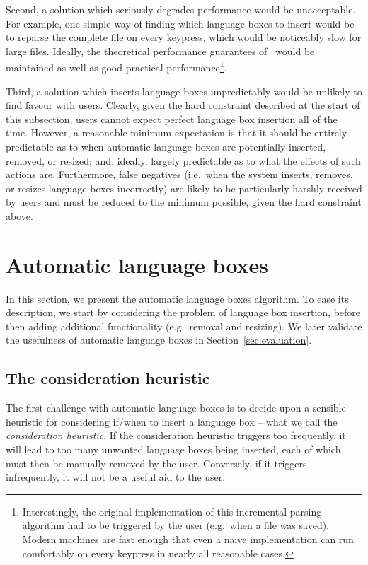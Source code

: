 \documentclass[sigplan,screen]{acmart}\settopmatter{printfolios=true,printccs=false,printacmref=false}
\begin{document}
Second, a solution which seriously degrades performance would be unacceptable.
For example, one simple way of finding which language boxes to insert would
be to reparse the complete file on every keypress, which would be noticeably slow for large
files. Ideally, the theoretical performance guarantees
of~\citet{wagner98practicalalgorithms} would be maintained as well as good
practical performance\footnote{Interestingly, the original implementation of
this incremental parsing algorithm had to be triggered by the user (e.g.~when
a file was saved). Modern machines are fast enough that even a naive
implementation can run comfortably on every keypress in nearly all reasonable
cases.}.

Third, a solution which inserts language boxes unpredictably would be unlikely
to find favour with users. Clearly, given the hard constraint described at the
start of this subsection, users cannot expect perfect language box insertion
all of the time. However, a reasonable minimum expectation is that it should be
entirely predictable as to when automatic language boxes are potentially
inserted, removed, or
resized; and, ideally, largely predictable as to what the effects of such
actions are. Furthermore, false negatives (i.e.~when the system inserts, removes,
or resizes language boxes incorrectly) are likely to be particularly harshly
received by users and must be reduced to the minimum possible, given the hard
constraint above.


\section{Automatic language boxes}

In this section, we present the automatic language boxes algorithm. To ease its
description, we start by considering the problem of language box
insertion, before then adding additional functionality (e.g.~removal and
resizing). We later validate the usefulness of automatic language boxes in
Section~\ref{sec:evaluation}.


\subsection{The consideration heuristic}

The first challenge with automatic language boxes is to decide upon a sensible
heuristic for considering if/when to insert a language box -- what we call the
\emph{consideration heuristic}. If the consideration heuristic triggers too
frequently, it will lead to too many unwanted language boxes being inserted,
each of which must then be manually removed by the user.
Conversely, if it triggers infrequently, it will not be a useful aid to the user.
\end{document}
